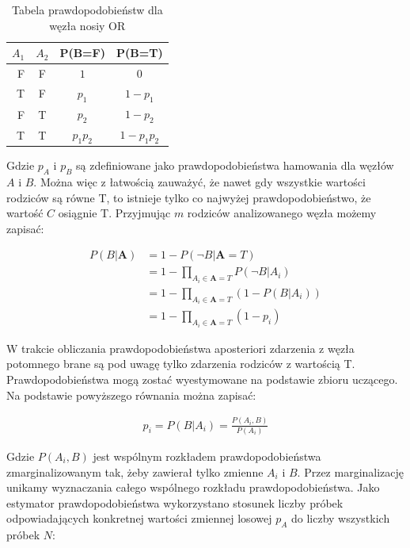 \documentclass[12pt]{article}
\begin{document}
\begin{table}
\caption{Tabela prawdopodobieństw dla węzła nosiy OR}
\label{nosiy OR}
\centering
\begin{tabular}{|r|c|c|c|}
  \hline 
  $A_1$ & $A_2$ & P(B=F) & P(B=T)\\
  \hline
  F & F & $1$ & $0$\\
  \hline
  T & F & $p_1$ & $1-p_1$ \\
  \hline
  F & T & $p_2$ & $1-p_2$ \\
  \hline
  T & T & $p_1 p_2$ & $1 - p_1 p_2$ \\
  \hline
\end{tabular}
\end{table} 

Gdzie $p_A$ i $p_B$ są zdefiniowane jako prawdopodobieństwa hamowania dla węzłów $A$ i $B$. Można więc z łatwością zauważyć, że nawet gdy wszystkie wartości rodziców są równe T, to istnieje tylko co najwyżej prawdopodobieństwo, że wartość $C$ osiągnie T. Przyjmując $m$ rodziców analizowanego węzła możemy zapisać:

\begin{equation}
\begin{aligned}
	P(B|\mathbf{A}) &= 1 - P(\neg B | \mathbf{A}=T) \\
	&= 1 - \prod_{A_i \in \mathbf{A}=T} P(\neg B | A_i) \\
	&= 1 - \prod_{A_i \in \mathbf{A}=T} (1 - P(B|A_i)) \\
	&= 1 - \prod_{A_i \in \mathbf{A}=T} (1 - p_i)
\end{aligned}
\end{equation}

W trakcie obliczania prawdopodobieństwa aposteriori zdarzenia z węzła potomnego brane są pod uwagę tylko zdarzenia rodziców z wartością T. Prawdopodobieństwa mogą zostać wyestymowane na podstawie zbioru uczącego. Na podstawie powyższego równania można zapisać:

\begin{equation}
\begin{aligned}
	p_i = P(B|A_i) = \frac{P(A_i, B)}{P(A_i)}
\end{aligned}
\end{equation}

Gdzie $P(A_i, B)$ jest wspólnym rozkładem prawdopodobieństwa zmarginalizowanym tak, żeby zawierał tylko zmienne $A_i$ i $B$. Przez marginalizację unikamy wyznaczania całego wspólnego rozkładu prawdopodobieństwa. Jako estymator prawdopodobieństwa wykorzystano stosunek liczby próbek odpowiadających konkretnej wartości zmiennej losowej $p_A$ do liczby wszystkich próbek $N$:
\end{document}
